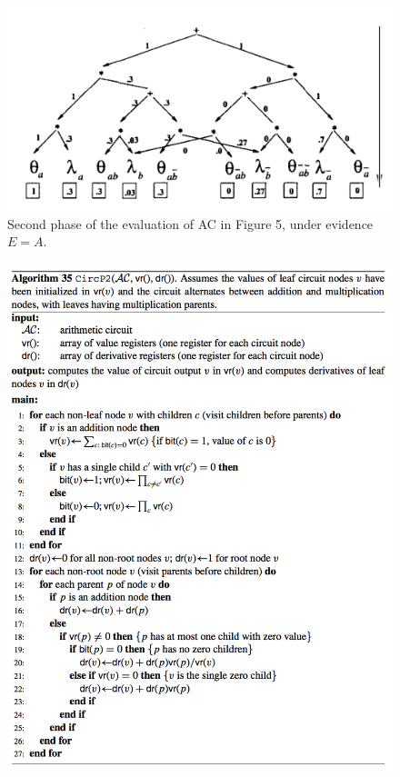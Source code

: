 \documentclass[twoside,11pt]{article}
\begin{document}
\begin{figure}[!htb]
    \begin{center}
    	\includegraphics[width=\columnwidth]{figures/deriv.png}
		\caption{Second phase of the evaluation of AC in Figure 5, under evidence $E=A$.}
		\label{fig:deri}
    \end{center}
\end{figure}

\begin{figure}[!htb]
    \begin{center}
    	\includegraphics[width=\columnwidth]{figures/alg.png}
		\label{fig:alg}
    \end{center}
\end{figure}
\end{document}
